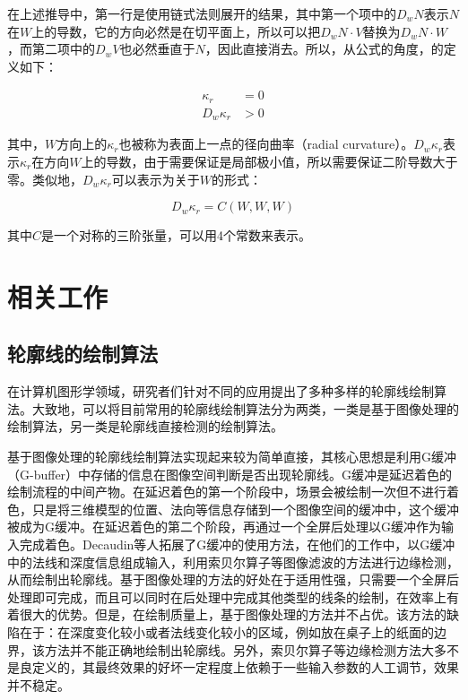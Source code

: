 在上述推导中，第一行是使用链式法则展开的结果，其中第一个项中的$D_w{N}$表示$N$在$W$上的导数，它的方向必然是在切平面上，所以可以把$D_w{N}\cdot{V}$替换为$D_w{N}\cdot{W}$，而第二项中的$D_w{V}$也必然垂直于$N$，因此直接消去。所以，从公式的角度，\scon{}的定义如下：

\begin{align}
  \kappa_r &= 0\\
  D_w\kappa_r &> 0
\end{align}

其中，$W$方向上的$\kappa_r$也被称为表面上一点的径向曲率（radial curvature）。$D_w\kappa_r$表示$\kappa_r$在方向$W$上的导数，由于需要保证是局部极小值，所以需要保证二阶导数大于零。类似地，$D_w\kappa_r$可以表示为关于$W$的形式：

\begin{equation}
    D_w\kappa_r = C(W, W, W)
\end{equation}

其中$C$是一个对称的三阶张量，可以用4个常数来表示。

\section{相关工作}

\subsection{轮廓线的绘制算法}

在计算机图形学领域，研究者们针对不同的应用提出了多种多样的轮廓线绘制算法。大致地，可以将目前常用的轮廓线绘制算法分为两类，一类是基于图像处理的绘制算法，另一类是轮廓线直接检测的绘制算法。

基于图像处理的轮廓线绘制算法实现起来较为简单直接，其核心思想是利用G缓冲（G-buffer）中存储的信息在图像空间判断是否出现轮廓线。G缓冲是延迟着色\cite{duluk2004deferred}的绘制流程的中间产物。在延迟着色的第一个阶段中，场景会被绘制一次但不进行着色，只是将三维模型的位置、法向等信息存储到一个图像空间的缓冲中，这个缓冲被成为G缓冲。在延迟着色的第二个阶段，再通过一个全屏后处理以G缓冲作为输入完成着色。Decaudin等人拓展了G缓冲的使用方法，在他们的工作\cite{decaudin1996cartoon}中，以G缓冲中的法线和深度信息组成输入，利用索贝尔算子\cite{gao2010improved}等图像滤波的方法进行边缘检测，从而绘制出轮廓线。基于图像处理的方法的好处在于适用性强，只需要一个全屏后处理即可完成，而且可以同时在后处理中完成其他类型的线条的绘制，在效率上有着很大的优势。但是，在绘制质量上，基于图像处理的方法并不占优。该方法的缺陷在于：在深度变化较小或者法线变化较小的区域，例如放在桌子上的纸面的边界，该方法并不能正确地绘制出轮廓线。另外，索贝尔算子等边缘检测方法大多不是良定义的，其最终效果的好坏一定程度上依赖于一些输入参数的人工调节，效果并不稳定。

